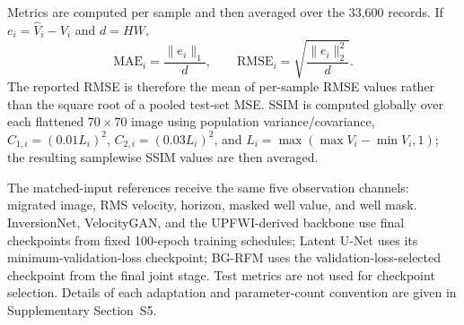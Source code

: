 Metrics are computed per sample and then averaged over the 33,600 records. If $e_i=\hat V_i-V_i$ and $d=HW$,
\begin{equation}
\mathrm{MAE}_i=\frac{\|e_i\|_1}{d},
\qquad
\mathrm{RMSE}_i=\sqrt{\frac{\|e_i\|_2^2}{d}}.
\end{equation}
The reported RMSE is therefore the mean of per-sample RMSE values rather than the square root of a pooled test-set MSE. SSIM is computed globally over each flattened $70\times70$ image using population variance/covariance, $C_{1,i}=(0.01L_i)^2$, $C_{2,i}=(0.03L_i)^2$, and
$L_i=\max(\max V_i-\min V_i,1)$; the resulting samplewise SSIM values are then averaged.

The matched-input references receive the same five observation channels: migrated image, RMS velocity, horizon, masked well value, and well mask. InversionNet, VelocityGAN, and the UPFWI-derived backbone use final checkpoints from fixed 100-epoch training schedules; Latent U-Net uses its minimum-validation-loss checkpoint; BG-RFM uses the validation-loss-selected checkpoint from the final joint stage. Test metrics are not used for checkpoint selection. Details of each adaptation and parameter-count convention are given in Supplementary Section~S5.
